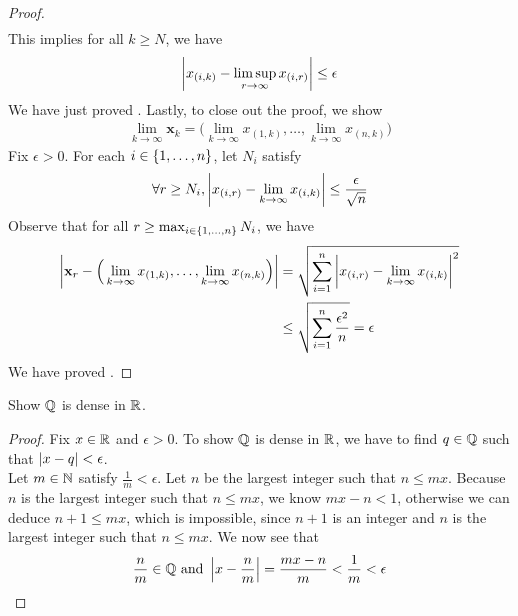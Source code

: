 \documentclass{report}
\begin{document}
\begin{proof}
\begin{align*}
\end{align*}
This implies for all $k\geq N$, we have 
\begin{align*}
\left|x_{(i,k)}-\limsup_{r\to\infty} x_{(i,r)}\right|\leq \epsilon 
\end{align*}
We have just proved . Lastly, to close out the proof, we show 
\begin{align}
\label{ran3}
\lim_{k\to \infty}\textbf{x}_k = \Big(\lim_{k\to \infty}x_{(1,k)},\dots ,\lim_{k\to \infty}x_{(n,k)}\Big)
\end{align}
Fix $\epsilon >0$. For each $i \in \{ 1,\dots ,n \}$, let $N_i$ satisfy 
 \begin{align*}
  \forall r\geq N_i ,\left|x_{(i,r)}- \lim_{k\to \infty}x_{(i,k)}\right|\leq  \frac{\epsilon }{\sqrt{n} }
\end{align*}
Observe that for all $r\geq \max_{i\in \{ 1,\dots,n \}} N_i$, we have 
\begin{align*}
\left|\textbf{x}_r - \Big(\lim_{k\to \infty}x_{(1,k)},\dots ,\lim_{k\to \infty}x_{(n,k)} \Big)\right|&=\sqrt{\sum_{i=1}^n \left|x_{(i,r)}- \lim_{k\to \infty}x_{(i,k)}\right|^2} \\
&\leq \sqrt{\sum_{i=1}^n \frac{\epsilon^2}{n}}=\epsilon 
\end{align*}
We have proved .











\end{proof}
\begin{question}{}{}
Show $\mathbb{Q}$ is dense in $\mathbb{R}$. 
\end{question}
\begin{proof}
Fix $x\in\mathbb{R}$ and $\epsilon >0$. To show $\mathbb{Q}$ is dense in  $\mathbb{R}$, we have to find $q\in\mathbb{Q}$ such that $\left|x-q\right|<\epsilon $.\\

Let $m\in\mathbb{N}$ satisfy $\frac{1}{m}<\epsilon $. Let $n$ be the largest integer such that $n\leq mx$. Because $n$ is the largest integer such that $n\leq mx$, we know $mx-n<1$, otherwise we can deduce $n+1\leq mx$, which is impossible, since $n+1$ is an integer and $n$ is the largest integer such that $n\leq mx$. We now see that 
\begin{align*}
\frac{n}{m}\in\mathbb{Q} \text{ and }\left|x-\frac{n}{m}\right|=\frac{mx-n}{m}< \frac{1}{m}<\epsilon 
\end{align*}



\end{proof}
\end{document}
